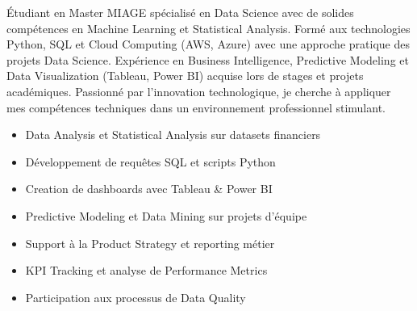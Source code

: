 \documentclass[10pt,a4paper,normalphoto]{altacv}
\begin{document}




\begin{fullwidth}
\makecvheader
\vspace{-0.8em}
\end{fullwidth}

\begin{fullwidth}
Étudiant en Master MIAGE spécialisé en Data Science avec de solides compétences en Machine Learning et Statistical Analysis. Formé aux technologies Python, SQL et Cloud Computing (AWS, Azure) avec une approche pratique des projets Data Science. Expérience en Business Intelligence, Predictive Modeling et Data Visualization (Tableau, Power BI) acquise lors de stages et projets académiques. Passionné par l'innovation technologique, je cherche à appliquer mes compétences techniques dans un environnement professionnel stimulant.
\end{fullwidth}


\begin{itemize}
\item Data Analysis et Statistical Analysis sur datasets financiers
\item Développement de requêtes SQL et scripts Python
\item Creation de dashboards avec Tableau \& Power BI
\item Predictive Modeling et Data Mining sur projets d'équipe
\item Support à la Product Strategy et reporting métier
\item KPI Tracking et analyse de Performance Metrics
\item Participation aux processus de Data Quality
\end{itemize}
\end{document}
